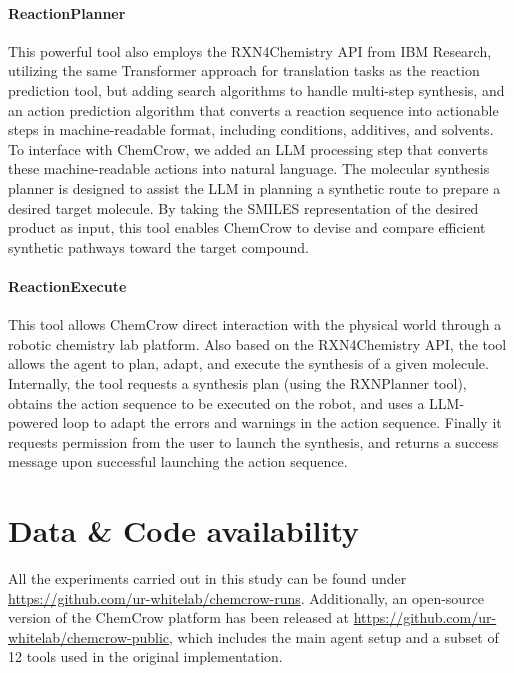 \documentclass[10pt]{article}
\begin{document}
\paragraph{ReactionPlanner}
This powerful tool also employs the RXN4Chemistry API from IBM Research\cite{rxn4chemistry, schwaller2019molecular, schwaller2020predicting}, utilizing the same Transformer approach for translation tasks as the reaction prediction tool, but adding search algorithms to handle multi-step synthesis, and an action prediction algorithm that converts a reaction sequence into actionable steps in machine-readable format, including conditions, additives, and solvents\cite{vaucher_inferring_2021}. To interface with ChemCrow, we added an LLM processing step that converts these machine-readable actions into natural language. The molecular synthesis planner is designed to assist the LLM in planning a synthetic route to prepare a desired target molecule. By taking the SMILES representation of the desired product as input, this tool enables ChemCrow to devise and compare efficient synthetic pathways toward the target compound.


\paragraph{ReactionExecute}
This tool allows ChemCrow direct interaction with the physical world through a robotic chemistry lab platform. Also based on the RXN4Chemistry API, the tool allows the agent to plan, adapt, and execute the synthesis of a given molecule. Internally, the tool requests a synthesis plan (using the RXNPlanner tool), obtains the action sequence to be executed on the robot, and uses a LLM-powered loop to adapt the errors and warnings in the action sequence. Finally it requests permission from the user to launch the synthesis, and returns a success message upon successful launching the action sequence.

\section*{Data \& Code availability}
All the experiments carried out in this study can be found under \url{https://github.com/ur-whitelab/chemcrow-runs}. Additionally, an open-source version of the ChemCrow platform has been released at \url{https://github.com/ur-whitelab/chemcrow-public}, which includes the main agent setup and a subset of 12 tools used in the original implementation.
\end{document}
